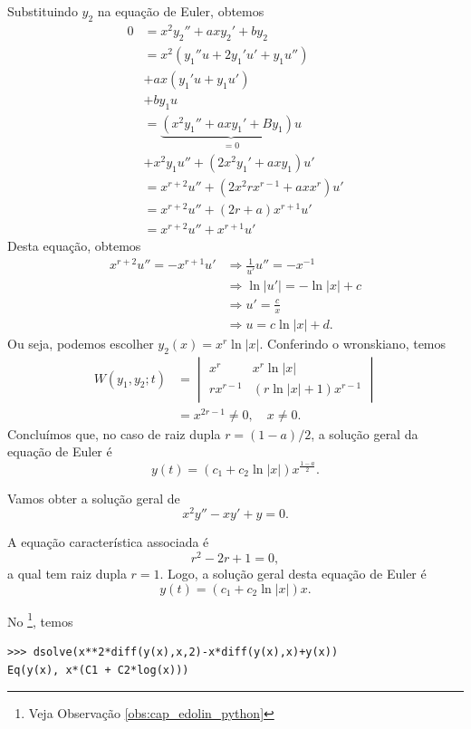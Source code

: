 Substituindo $y_2$ na equação de Euler, obtemos
\begin{align}
  0 &= x^2y_2'' + axy_2' + by_2 \\
    &= x^2\left(y_1''u + 2y_1'u' + y_1u''\right) \\
    &+ ax\left(y_1'u + y_1u'\right) \\
    &+ by_1u \\
    &= \underbrace{\left(x^2y_1'' + axy_1' + By_1\right)u}_{=0} \\
    &+ x^2y_1u'' + (2x^2y_1' + axy_1)u' \\
    &= x^{r+2}u'' + (2x^2rx^{r-1} + axx^r)u' \\
    &= x^{r+2}u'' + (2r+a)x^{r+1}u' \\
    &= x^{r+2}u'' + x^{r+1}u' 
\end{align}
Desta equação, obtemos
\begin{align}
  x^{r+2}u'' = -x^{r+1}u' &\Rightarrow \frac{1}{u'}u'' = -x^{-1} \\
                                &\Rightarrow \ln|u'| = -\ln|x| + c \\
                          &\Rightarrow u' = \frac{c}{x} \\
                          &\Rightarrow u = c\ln|x| + d.
\end{align}
Ou seja, podemos escolher $y_2(x) = x^r\ln|x|$. Conferindo o wronskiano, temos
\begin{align}
  W(y_1,y_2;t) &=
  \begin{vmatrix}
    x^r & x^r\ln|x| \\
    rx^{r-1} & (r\ln|x| + 1)x^{r-1}
  \end{vmatrix} \\
        &= x^{2r-1} \neq 0,\quad x\neq 0.
\end{align}
Concluímos que, no caso de raiz dupla $r=(1-a)/2$, a solução geral da equação de Euler é
\begin{equation}
  y(t) = (c_1 + c_2\ln|x|)x^{\frac{1-a}{2}}.
\end{equation}

\begin{ex}
  Vamos obter a solução geral de
  \begin{equation}
    x^2y'' - xy' + y = 0.
  \end{equation}

  A equação característica associada é
  \begin{equation}
    r^2 -2r + 1 = 0,
  \end{equation}
  a qual tem raiz dupla $r = 1$. Logo, a solução geral desta equação de Euler é
  \begin{equation}
    y(t) = (c_1 + c_2\ln|x|)x.
  \end{equation}

  \ifispython
  No \python\footnote{Veja Observação \ref{obs:cap_edolin_python}}, temos
\begin{verbatim}
>>> dsolve(x**2*diff(y(x),x,2)-x*diff(y(x),x)+y(x))
Eq(y(x), x*(C1 + C2*log(x)))
\end{verbatim}
  \fi  
\end{ex}

